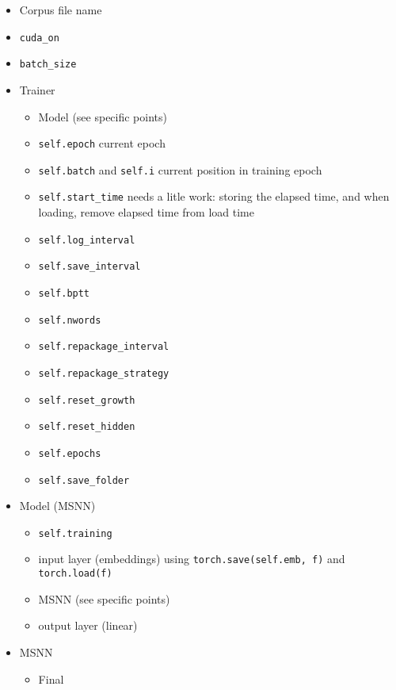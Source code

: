 \begin{itemize}
\item
  Corpus file name
\item
  \lstinline!cuda_on!
\item
  \lstinline!batch_size!
\item
  Trainer

  \begin{itemize}
  \item
    Model (see specific points)
  \item
    \lstinline!self.epoch! current epoch
  \item
    \lstinline!self.batch! and \lstinline!self.i! current position in
    training epoch
  \item
    \lstinline!self.start_time! needs a litle work: storing the elapsed
    time, and when loading, remove elapsed time from load time
  \item
    \lstinline!self.log_interval!
  \item
    \lstinline!self.save_interval!
  \item
    \lstinline!self.bptt!
  \item
    \lstinline!self.nwords!
  \item
    \lstinline!self.repackage_interval!
  \item
    \lstinline!self.repackage_strategy!
  \item
    \lstinline!self.reset_growth!
  \item
    \lstinline!self.reset_hidden!
  \item
    \lstinline!self.epochs!
  \item
    \lstinline!self.save_folder!
  \end{itemize}
\item
  Model (MSNN)

  \begin{itemize}
  \item
    \lstinline!self.training!
  \item
    input layer (embeddings) using \lstinline!torch.save(self.emb, f)!
    and \lstinline!torch.load(f)!
  \item
    MSNN (see specific points)
  \item
    output layer (linear)
  \end{itemize}
\item
  MSNN

  \begin{itemize}
  \item
    Final


\end{itemize}
\end{itemize}
